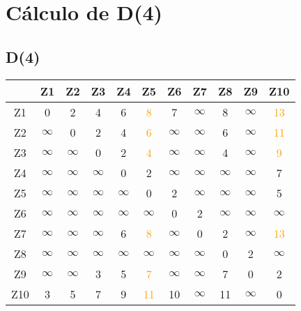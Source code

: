 \documentclass[a4paper,11pt]{article}
\begin{document}
\section*{Cálculo de D(4)}
\subsection*{D(4)}
\begin{center}
\begin{tabular}{c|cccccccccc}
 & Z1 & Z2 & Z3 & Z4 & Z5 & Z6 & Z7 & Z8 & Z9 & Z10 \\ \hline
Z1 & 0 & 2 & 4 & 6 & \textcolor{orange}{8} & 7 & $\infty$ & 8 & $\infty$ & \textcolor{orange}{13} \\
Z2 & $\infty$ & 0 & 2 & 4 & \textcolor{orange}{6} & $\infty$ & $\infty$ & 6 & $\infty$ & \textcolor{orange}{11} \\
Z3 & $\infty$ & $\infty$ & 0 & 2 & \textcolor{orange}{4} & $\infty$ & $\infty$ & 4 & $\infty$ & \textcolor{orange}{9} \\
Z4 & $\infty$ & $\infty$ & $\infty$ & 0 & 2 & $\infty$ & $\infty$ & $\infty$ & $\infty$ & 7 \\
Z5 & $\infty$ & $\infty$ & $\infty$ & $\infty$ & 0 & 2 & $\infty$ & $\infty$ & $\infty$ & 5 \\
Z6 & $\infty$ & $\infty$ & $\infty$ & $\infty$ & $\infty$ & 0 & 2 & $\infty$ & $\infty$ & $\infty$ \\
Z7 & $\infty$ & $\infty$ & $\infty$ & 6 & \textcolor{orange}{8} & $\infty$ & 0 & 2 & $\infty$ & \textcolor{orange}{13} \\
Z8 & $\infty$ & $\infty$ & $\infty$ & $\infty$ & $\infty$ & $\infty$ & $\infty$ & 0 & 2 & $\infty$ \\
Z9 & $\infty$ & $\infty$ & 3 & 5 & \textcolor{orange}{7} & $\infty$ & $\infty$ & 7 & 0 & 2 \\
Z10 & 3 & 5 & 7 & 9 & \textcolor{orange}{11} & 10 & $\infty$ & 11 & $\infty$ & 0 \\
\end{tabular}
\end{center}
\end{document}
